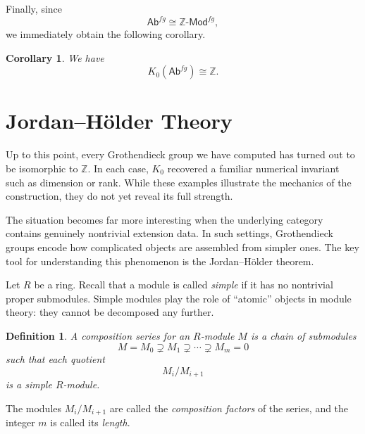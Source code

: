 \documentclass[12pt,reqno]{amsart}
\theoremstyle{plain}
\newtheorem{cor}[thm]{Corollary}
\newtheorem{defn}[thm]{Definition}
\numberwithin{equation}{section}
\begin{document}
Finally, since
\[
\mathsf{Ab}^{fg}\cong \mathbb Z\textsf{-Mod}^{fg},
\]
we immediately obtain the following corollary.

\begin{cor}\label{cor: ABfg}
We have \[
K_0(\mathsf{Ab}^{fg})\cong \mathbb Z.
\]
\end{cor}





























\section{Jordan--H\"older Theory}

Up to this point, every Grothendieck group we have computed has turned out to be isomorphic to $\mathbb Z$. In each case, $K_0$ recovered a familiar numerical invariant such as dimension or rank. While these examples illustrate the mechanics of the construction, they do not yet reveal its full strength.

The situation becomes far more interesting when the underlying category contains genuinely nontrivial extension data. In such settings, Grothendieck groups encode how complicated objects are assembled from simpler ones. The key tool for understanding this phenomenon is the Jordan--H\"older theorem.

Let $R$ be a ring. Recall that a module is called \emph{simple} if it has no nontrivial proper submodules. Simple modules play the role of ``atomic'' objects in module theory: they cannot be decomposed any further.

\begin{defn}
A \emph{composition series} for an $R$-module $M$ is a chain of submodules
\[
M=M_0\supsetneq M_1\supsetneq \cdots \supsetneq M_m=0
\]
such that each quotient
\[
M_i/M_{i+1}
\]
is a simple $R$-module.
\end{defn}
The modules $M_i/M_{i+1}$ are called the \emph{composition factors} of the series, and the integer $m$ is called its \emph{length}.
\end{document}
